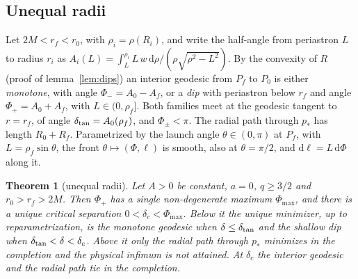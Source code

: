 \documentclass[aip,jmp,amsmath,amssymb,reprint]{revtex4-2}
\newcommand{\dd}{\mathrm{d}}
\theoremstyle{plain}
\newtheorem{theorem}{Theorem}
\theoremstyle{definition}
\begin{document}
\subsection{Unequal radii}
Let $2M<r_f<r_0$, with $\rho_i=\rho(R_i)$, and write the half-angle from periastron $L$ to
radius $r_i$ as $A_i(L)=\int_L^{\rho_i}L\,w\,\dd\rho/(\rho\sqrt{\rho^2-L^2})$. By the convexity of
$R$ (proof of lemma~\ref{lem:dips}) an interior geodesic from $P_f$ to $P_0$ is either
\emph{monotone}, with angle $\Phi_-=A_0-A_f$, or a \emph{dip} with periastron below $r_f$ and
angle $\Phi_+=A_0+A_f$, with $L\in(0,\rho_f]$. Both families meet at the geodesic tangent to
$r=r_f$, of angle $\delta_{\rm tan}=A_0(\rho_f)$, and $\Phi_\pm<\pi$. The radial path through
$p_*$ has length $R_0+R_f$. Parametrized by the launch angle $\theta\in(0,\pi)$ at $P_f$, with
$L=\rho_f\sin\theta$, the front $\theta\mapsto(\Phi,\ell)$ is smooth, also at $\theta=\pi/2$, and
$\dd\ell=L\,\dd\Phi$ along it.

\begin{theorem}[unequal radii]\label{thm:unequal}
Let $A>0$ be constant, $a=0$, $q\ge3/2$ and $r_0>r_f>2M$. Then $\Phi_+$ has a single
non-degenerate maximum $\Phi_{\max}$, and there is a unique critical separation
$0<\delta_c<\Phi_{\max}$. Below it the unique minimizer, up to reparametrization, is the
monotone geodesic when $\delta\le\delta_{\rm tan}$ and the shallow dip when
$\delta_{\rm tan}<\delta<\delta_c$. Above it only the radial path through $p_*$ minimizes in the
completion and the physical infimum is not attained. At $\delta_c$ the interior geodesic and the
radial path tie in the completion.
\end{theorem}
\end{document}
